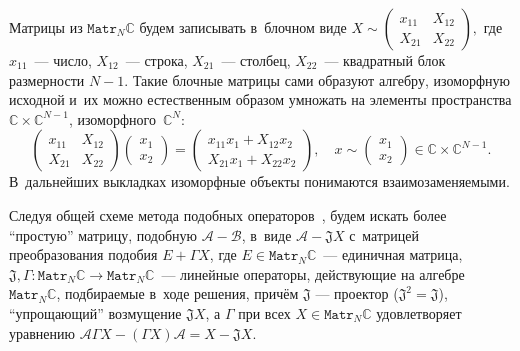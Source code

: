\documentclass[a4paper]{article}
\theoremstyle{definition}
\begin{document}
Матрицы из \( \mathtt{Matr}_N\mathbb{C} \) будем записывать в~блочном виде
\( X \sim
    \begin{pmatrix}
    x_{11} & X_{12} \\
    X_{21} & X_{22}
    \end{pmatrix}, \)
    где \( x_{11} \)~--- число,
    \( X_{12} \)~--- строка, \( X_{21} \)~--- столбец,
    \( X_{22} \)~--- квадратный блок размерности \( N-1 \).
Такие блочные матрицы сами образуют алгебру, изоморфную исходной
и~их можно естественным образом умножать
на элементы пространства \( \mathbb{C}\times\mathbb{C}^{N-1} \),
изоморфного~\( \mathbb{C}^N \):
\[
    \begin{pmatrix}
    x_{11} & X_{12} \\
    X_{21} & X_{22}
    \end{pmatrix}
    \begin{pmatrix} x_1 \\ x_2 \end{pmatrix}
  = \begin{pmatrix}
      x_{11} x_1 + X_{12} x_2 \\
      X_{21} x_1 + X_{22} x_2
      \end{pmatrix},\quad x \sim \begin{pmatrix} x_1 \\ x_2 \end{pmatrix}\in \mathbb{C}\times\mathbb{C}^{N-1}.
    \]
В~дальнейших выкладках изоморфные объекты понимаются взаимозаменяемыми.

Следуя общей схеме метода подобных операторов~\cite{baskakov-split},
будем искать более ``простую'' матрицу, подобную \( \mathcal{A} - \mathcal{B} \),
в~виде \( \mathcal{A} - \mathfrak{J} X \)
с~матрицей преобразования подобия \( E + \Gamma X \),
где \( E\in{\mathtt{Matr}_N\mathbb{C}} \)~--- единичная матрица,
\( \mathfrak{J},\Gamma : \mathtt{Matr}_N\mathbb{C}\to\mathtt{Matr}_N\mathbb{C} \)~--- линейные операторы,
действующие на алгебре \( \mathtt{Matr}_N\mathbb{C} \), подбираемые
в~ходе решения,
      прич\"ем \( \mathfrak{J} \) --- проектор (\(\mathfrak{J}^2=\mathfrak{J}\)),
      ``упрощающий'' возмущение \( \mathfrak{J}X \),
      а \( \Gamma \)
      при всех \( X\in {\mathtt{Matr}_N\mathbb{C}} \) %
      удовлетворяет уравнению
          \( \mathcal{A}\Gamma X - (\Gamma X) \mathcal{A} = X - \mathfrak{J}X. \)
\end{document}
